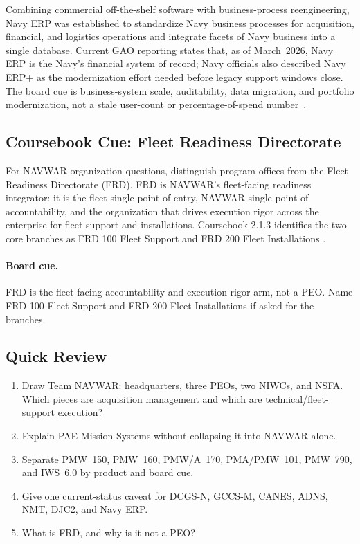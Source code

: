 \documentclass[../main.tex]{subfiles}
\begin{document}
Combining commercial off-the-shelf software with business-process reengineering, Navy ERP was established to standardize Navy business processes for acquisition, financial, and logistics operations and integrate facets of Navy business into a single database. Current GAO reporting states that, as of March~2026, Navy ERP is the Navy's financial system of record; Navy officials also described Navy ERP+ as the modernization effort needed before legacy support windows close. The board cue is business-system scale, auditability, data migration, and portfolio modernization, not a stale user-count or percentage-of-spend number~\autocite{GAO-Navy-ERP-2026,PEOMLB-home-2026}.

\subsection{Coursebook Cue: Fleet Readiness Directorate}

For NAVWAR organization questions, distinguish program offices from the Fleet
Readiness Directorate (FRD).  FRD is NAVWAR's fleet-facing readiness integrator:
it is the fleet single point of entry, NAVWAR single point of accountability,
and the organization that drives execution rigor across the enterprise for
fleet support and installations.  Coursebook 2.1.3 identifies the two core
branches as FRD 100 Fleet Support and FRD 200 Fleet Installations
\autocite{edo-2-1-3-navwar-enterprise-2024}.

\paragraph{Board cue.}
FRD is the fleet-facing accountability and execution-rigor arm, not a PEO.  Name
FRD 100 Fleet Support and FRD 200 Fleet Installations if asked for the branches.

\subsection{Quick Review}
\begin{enumerate}
  \item Draw Team NAVWAR: headquarters, three PEOs, two NIWCs, and NSFA. Which pieces are acquisition management and which are technical/fleet-support execution?
  \item Explain PAE Mission Systems without collapsing it into NAVWAR alone.
  \item Separate PMW~150, PMW~160, PMW/A~170, PMA/PMW~101, PMW~790, and IWS~6.0 by product and board cue.
  \item Give one current-status caveat for DCGS-N, GCCS-M, CANES, ADNS, NMT, DJC2, and Navy ERP.
  \item What is FRD, and why is it not a PEO?
\end{enumerate}

\end{document}
